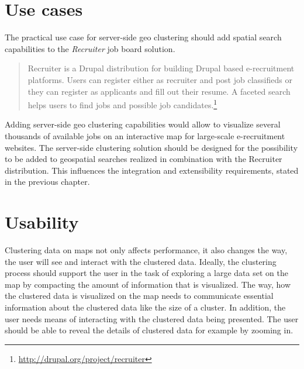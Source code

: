 \section{Use cases}
\label{chapter:objective-use-cases}

The practical use case for server-side geo clustering should add spatial search capabilities to the \textit{Recruiter} job board solution.

\begin{quote}
Recruiter is a Drupal distribution for building Drupal based e-recruitment platforms. Users can register either as recruiter and post job classifieds or they can register as applicants and fill out their resume. A faceted search helps users to find jobs and possible job candidates.\footnote{\url{http://drupal.org/project/recruiter}}
\end{quote}

Adding server-side geo clustering capabilities would allow to visualize several thousands of available jobs on an interactive map for large-scale e-recruitment websites. The server-side clustering solution should be designed for the possibility to be added to geospatial searches realized in combination with the Recruiter distribution. This influences the integration and extensibility requirements, stated in the previous chapter.

\section{Usability}
\label{chapter:objective-usability}

Clustering data on maps not only affects performance, it also changes the way, the user will see and interact with the clustered data. Ideally, the clustering process should support the user in the task of exploring a large data set on the map by compacting the amount of information that is visualized. The way, how the clustered data is visualized on the map needs to communicate essential information about the clustered data like the size of a cluster. In addition, the user needs means of interacting with the clustered data being presented. The user should be able to reveal the details of clustered data for example by zooming in. 

















